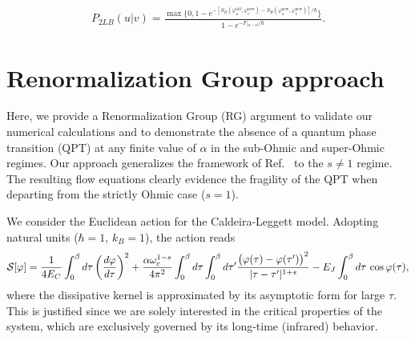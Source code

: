 \documentclass[aps,notitlepage,twocolumn,prl,nolongbibliography,superscriptaddress]{revtex4-2}
\begin{document}
\begin{equation*}
\begin{split}
    P_{2LB}(u|v)  =  \frac{\max \biggl\{0, 1-e^{-[S_{R}(\varphi^{\text{old}}_u,\varphi_v^{\text{new}})-S_R(\varphi^{\text{new}}_u,\varphi_v^{\text{new}})]/\hbar}\biggr\}}{1 -e^{-F_{\left|u-v\right|}/\hbar}}.
    \end{split}
\end{equation*}

\section{Renormalization Group approach}
Here, we provide a Renormalization Group (RG) argument to validate our numerical calculations and to demonstrate the absence of a quantum phase transition (QPT) at any finite value of $\alpha$ in the sub-Ohmic and super-Ohmic regimes. Our approach generalizes the framework of Ref.~\cite{Fisher_Zwerger} to the $s \neq 1$ regime. The resulting flow equations clearly evidence the fragility of the QPT when departing from the strictly Ohmic case ($s = 1$).

We consider the Euclidean action for the Caldeira-Leggett model. Adopting natural units ($\hbar = 1$, $k_B = 1$), the action reads
\begin{equation}\label{eq:start}
    {\cal S}[\varphi] = \frac{1}{4E_C} \int_0^{\beta} d\tau\, \biggl(\frac{d\varphi}{d\tau}\biggr)^2 + \frac{\alpha \omega_c^{1-s}}{4\pi^2}\int_0^{\beta} d\tau \int_0^{\beta} d\tau' \frac{\bigl(\varphi(\tau)-\varphi(\tau')\bigr)^2}{|\tau -\tau'|^{1+s}} - E_J \int_0^{\beta} d\tau \, \cos \varphi(\tau),
\end{equation}
where the dissipative kernel is approximated by its asymptotic form for large $\tau$. This is justified since we are solely interested in the critical properties of the system, which are exclusively governed by its long-time (infrared) behavior.
\end{document}
